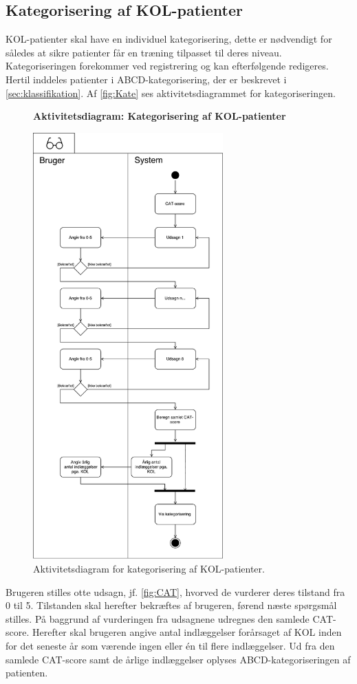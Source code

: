 \subsection*{Kategorisering af KOL-patienter} \label{sec:kategorisering}
KOL-patienter skal have en individuel kategorisering, dette er nødvendigt for således at sikre patienter får en træning tilpasset til deres niveau. Kategoriseringen forekommer ved registrering og kan efterfølgende redigeres.
Hertil inddeles patienter i ABCD-kategorisering, der er beskrevet i \autoref{sec:klassifikation}. Af \autoref{fig:Kate} ses aktivitetsdiagrammet for kategoriseringen.

\begin{figure} [H]
\centering
\textbf{Aktivitetsdiagram: Kategorisering af KOL-patienter}\par\medskip
\includegraphics[width=0.65\textwidth]{figures/aktivitetsdiagram/Kategorisering}
\caption{Aktivitetsdiagram for kategorisering af KOL-patienter.}
\label{fig:Kate}
\end{figure}

\noindent
Brugeren stilles otte udsagn, jf. \autoref{fig:CAT}, hvorved de vurderer deres tilstand fra 0 til 5. Tilstanden skal herefter bekræftes af brugeren, førend næste spørgsmål stilles. På baggrund af vurderingen fra udsagnene udregnes den samlede CAT-score. Herefter skal brugeren angive antal indlæggelser forårsaget af KOL inden for det seneste år som værende ingen eller én til flere indlæggelser. Ud fra den samlede CAT-score samt de årlige indlæggelser oplyses ABCD-kategoriseringen af patienten. 